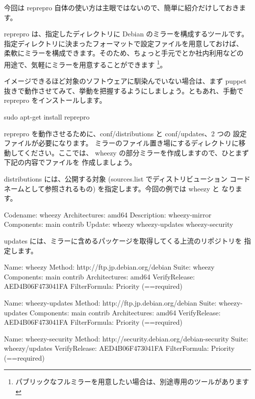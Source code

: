 \documentclass[mingoth,a4paper]{jsarticle}
\begin{document}
今回は reprepro 自体の使い方は主眼ではないので、簡単に紹介だけしておきます。

reprepro は、指定したディレクトリに Debian のミラーを構成するツールです。
指定ディレクトリに決まったフォーマットで設定ファイルを用意しておけば、
柔軟にミラーを構成できます。そのため、ちょっと手元でとか社内利用などの
用途で、気軽にミラーを用意することができます
\footnote{パブリックなフルミラーを用意したい場合は、別途専用のツールがあります}。

イメージできるほど対象のソフトウェアに馴染んでいない場合は、まず puppet
抜きで動作させてみて、挙動を把握するようにしましょう。ともあれ、手動で
reprepro をインストールします。

\begin{commandline}
sudo apt-get install reprepro
\end{commandline}

reprepro を動作させるために、conf/distributions と conf/updates、2 つの
設定ファイルが必要になります。
ミラーのファイル置き場にするディレクトリに移動してください。ここでは、
wheezy の部分ミラーを作成しますので、ひとまず下記の内容でファイルを
作成しましょう。

distributions には、公開する対象 (sources.list でディストリビューション
コードネームとして参照されるもの) を指定します。今回の例では wheezy と
なります。

\begin{commandline}
Codename: wheezy
Architectures: amd64
Description: wheezy-mirror
Components: main contrib
Update: wheezy wheezy-updates wheezy-security
\end{commandline}

updates には、ミラーに含めるパッケージを取得してくる上流のリポジトリを
指定します。

\begin{commandline}
Name: wheezy
Method: http://ftp.jp.debian.org/debian
Suite: wheezy
Components: main contrib
Architectures: amd64
VerifyRelease: AED4B06F473041FA
FilterFormula: Priority (==required)

Name: wheezy-updates
Method: http://ftp.jp.debian.org/debian
Suite: wheezy-updates
Components: main contrib
Architectures: amd64
VerifyRelease: AED4B06F473041FA
FilterFormula: Priority (==required)

Name: wheezy-security
Method: http://security.debian.org/debian-security
Suite: wheezy/updates
VerifyRelease: AED4B06F473041FA
FilterFormula: Priority (==required)
\end{commandline}
\end{document}
